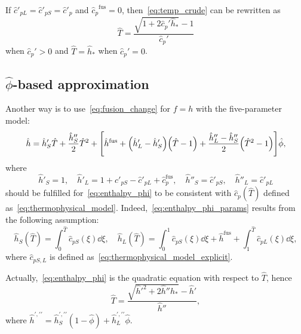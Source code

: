 \documentclass{article}
\newcommand{\fusion}[1]{{#1}^\mathrm{fus}}
\begin{document}
If \(\hat{c}'_{pL} = \hat{c}'_{pS} = \hat{c}'_p\) and \(\fusion{\hat{c}_{p}} = 0\),
then~\eqref{eq:temp_crude} can be rewritten as
\begin{equation}\label{eq:temp_crude2}
	\hat{T} = \frac{\sqrt{1+2\hat{c}_p'\hat{h}_*}-1}{\hat{c}_p'}
\end{equation}
when \(\hat{c}_p'>0\) and \(\hat{T} = \hat{h}_*\) when \(\hat{c}_p'=0\).

\subsection{\(\hat\phi\)-based approximation}

Another way is to use~\eqref{eq:fusion_change} for \(f=h\) with the five-parameter model:
\begin{equation}\label{eq:enthalpy_phi}
	\hat{h} = \hat{h}'_S\hat{T} + \frac{\hat{h}''_S}2\hat{T}^2 + \qty[
	    \fusion{\hat{h}} + \qty(\hat{h}'_L - \hat{h}'_S) \qty(\hat{T} - 1) +
	    \frac{\hat{h}''_L - \hat{h}''_S}2\qty( \hat{T}^2-1 )
	]\hat{\phi},
\end{equation}
where
\begin{equation}\label{eq:enthalpy_phi_params}
	\hat{h}'_S = 1, \quad \hat{h}'_L = 1 + \hat{c}'_{pS} - \hat{c}'_{pL} + \fusion{\hat{c}}_p, \quad
	\hat{h}''_S = \hat{c}'_{pS}, \quad \hat{h}''_L = \hat{c}'_{pL}
\end{equation}
should be fulfilled for~\eqref{eq:enthalpy_phi} to be consistent with \(\hat{c}_p(\hat{T})\)
defined as~\eqref{eq:thermophysical_model}.
Indeed,~\eqref{eq:enthalpy_phi_params} results from the following assumption:
\begin{equation}\label{eq:enthalpy_phi_explicit}
	\hat{h}_S(\hat{T}) = \int_0^{\hat{T}} \hat{c}_{pS}(\xi)\dd{\xi}, \quad
	\hat{h}_L(\hat{T}) = \int_0^1 \hat{c}_{pS}(\xi)\dd{\xi} + \fusion{\hat{h}} + \int_1^{\hat{T}} \hat{c}_{pL}(\xi)\dd{\xi},
\end{equation}
where \(\hat{c}_{pS,L}\) is defined as~\eqref{eq:thermophysical_model_explicit}.

Actually,~\eqref{eq:enthalpy_phi} is the quadratic equation with respect to \(\hat{T}\), hence
\begin{equation}\label{eq:temp_phi}
	\hat{T} = \frac{\sqrt{\hat{h}'^2 + 2\hat{h}''\hat{h}_*}-\hat{h}'}{\hat{h}''},
\end{equation}
where \(\hat{h}^{\prime,\prime\prime} = \hat{h}_S^{\prime,\prime\prime} (1-\hat\phi) + \hat{h}_L^{\prime,\prime\prime}\hat\phi\).
\end{document}
